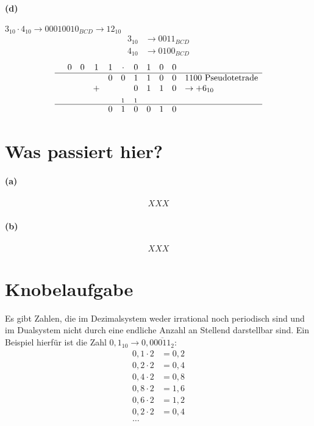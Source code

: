 \documentclass[a4paper]{article}
\begin{document}
\paragraph{(d)} $3_{10}\cdot 4_{10} \rightarrow 00010010_{BCD} \rightarrow 12_{10}$
\begin{align*}
	3_{10}&\rightarrow 0011_{BCD}\\
	4_{10}&\rightarrow 0100_{BCD}
\end{align*}
\begin{align*}
	\begin{array} {ccccccccccl}
	&0&0&1&1&\cdot&0&1&0&0& \\
	\hline
	&&&&0&0&1&1&0&0&1100 \text{ Pseudotetrade} \\
	&&&+&&&0&1&1&0& \rightarrow +6_{10} \\
	&&&&&_1&_1&&&& \\
	\hline
	&&&&0&1&0&0&1&0& \\
	\end{array}
\end{align*}


\section{Was passiert hier?}
\paragraph{(a)}
\begin{align*}
XXX
\end{align*}
\paragraph{(b)}
\begin{align*}
XXX
\end{align*}

\section{Knobelaufgabe}
Es gibt Zahlen, die im Dezimalsystem weder irrational noch periodisch sind und im Dualsystem nicht durch eine endliche Anzahl an Stellend darstellbar sind. Ein Beispiel hierfür ist die Zahl $0,1_{10} \rightarrow 0,0\overline{0011}_{2}$:
\begin{align*}
0,1 \cdot 2 &= 0,2 \\
0,2 \cdot 2 &= 0,4 \\
0,4 \cdot 2 &= 0,8 \\
0,8 \cdot 2 &= 1,6 \\
0,6 \cdot 2 &= 1,2 \\
0,2 \cdot 2 &= 0,4 \\
\text{\ldots}
\end{align*}
\end{document}
